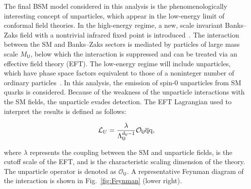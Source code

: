 The final BSM model considered in this analysis is the phenomenologically interesting concept of unparticles, which appear in the low-energy limit of conformal field theories.
In the high-energy regime, a new, scale invariant Banks--Zaks field with a nontrivial infrared fixed point is introduced~\cite{Banks:1981nn}.
The interaction between the SM and Banks--Zaks sectors is mediated by particles of large mass scale $M_{\textsf{U}}$, below which the interaction is suppressed and can be treated
via an effective field theory (EFT). The low-energy regime will include unparticles, which have phase space factors equivalent to those of a noninteger
number of ordinary particles~\cite{Kang:2014cia,Rinaldi:2014gha,Cheng:1988zx}. In this analysis, the emission of spin-0 unparticles from SM quarks is considered.
Because of the weakness of the unparticle interactions with the SM fields, the unparticle evades detection.
The EFT Lagrangian used to interpret the results is defined as follows:

\begin{equation*}
\mathcal{L}_{U}  = \frac{\lambda}{\Lambda_{\textsf{U}}^{d_{\textsf{U}}-1}} \mathcal{O}_{\textsf{U}} \overline{\mathrm{q}}\mathrm{q},
\end{equation*}

\noindent where $\lambda$ represents the coupling between the SM and unparticle fields, \LU is the cutoff scale of the EFT, and \dU is the characteristic scaling dimension of the theory.
The unparticle operator is denoted as $\mathcal{O}_{\textsf{U}}$.
A representative Feynman diagram of the interaction is shown in Fig.~\ref{fig:Feynman} (lower right).


